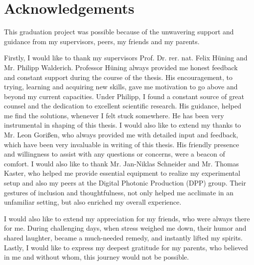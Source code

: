 \chapter*{Acknowledgements}
This graduation project was possible because of the unwavering support and guidance from my supervisors, peers, my friends and my parents.

\vspace{5mm}

\noindent Firstly, I would like to thank my supervisors Prof. Dr. rer. nat. Felix Hüning and Mr. Philipp Walderich. Professor Hüning always provided me honest feedback and constant support during the course of the thesis. His encouragement, to trying, learning and acquiring new skills, gave me motivation to go above and beyond my current capacities. Under Philipp, I found a constant source of great counsel and the dedication to excellent scientific research. His guidance, helped me find the solutions, whenever I felt stuck somewhere. He has been very instrumental in shaping of this thesis. I would also like to extend my thanks to Mr. Leon Gorißen, who always provided me with detailed input and feedback, which have been very invaluable in writing of this thesis. His friendly presence and willingness to assist with any questions or concerns, were a beacon of comfort. I would also like to thank Mr. Jan-Niklas Schneider and Mr. Thomas Kaster, who helped me provide essential equipment to realize my experimental setup and also my peers at the Digital Photonic Production (DPP) group. Their gestures of inclusion and thoughtfulness, not only helped me acclimate in an unfamiliar setting, but also enriched my overall experience.

\vspace{5mm}

\noindent I would also like to extend my appreciation for my friends, who were always there for me. During challenging days, when stress weighed me down, their humor and shared laughter, became a much-needed remedy, and instantly lifted my spirits. Lastly, I would like to express my deepest gratitude for my parents, who believed in me and without whom, this journey would not be possible.